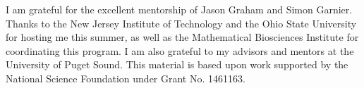I am grateful for the excellent mentorship of Jason Graham and Simon Garnier. Thanks to the New Jersey Institute of Technology and the Ohio State University for hosting me this summer, as well as the Mathematical Biosciences Institute for coordinating this program. I am also grateful to my advisors and mentors at the University of Puget Sound. This material is based upon work supported by the National Science Foundation under Grant No. 1461163.